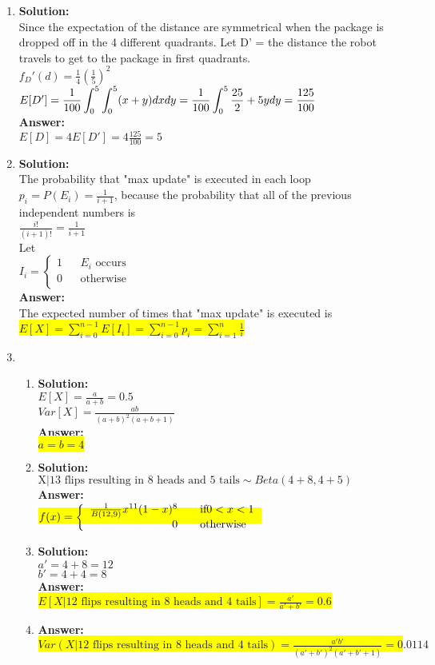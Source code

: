 \documentclass{article}
\newcommand{\myansw}{\textbf{Answer:}\\}
\newcommand{\mysolu}{\textbf{Solution:}\\}
\begin{document}
\begin{enumerate}
\begin{enumerate}
	\end{enumerate}
	\item
	\mysolu
	Since the expectation of the distance are symmetrical when the package is dropped off in the 4 different quadrants. Let D' = the distance the robot travels to get to the package in first quadrants.\\
	${f_D'(d) = \frac{1}{4}(\frac{1}{5})^2}$\\
	${E[D']=\mathlarger{\frac{1}{100}\int_{0}^{5} \int_{0}^{5} (x+y) dxdy=\frac{1}{100}\int_{0}^{5} \frac{25}{2}+5ydy=\frac{125}{100}}}$\\
	\myansw
	${E[D] = 4E[D'] = 4 \frac{125}{100} = 5}$\\
	\item
	\mysolu
	The probability that "max update" is executed in each loop ${p_i =P(E_i)= \frac{1}{i+1}}$, because the probability that all of the previous independent numbers is\\
	${ \frac{i!}{(i+1)!}=\frac{1}{i+1}}$\\
	Let\\
	${I_i = \left\lbrace \begin{array}{rcl}1 & & E_i \text{ occurs}\\
		0 & &  \text{otherwise}\\
		\end{array}\right.}$\\
	\myansw
	The expected number of times that "max update" is executed is\\
	\colorbox{yellow}{${E[X] = \sum\limits_{i = 0}^{n-1}E[I_i] = \sum\limits_{i = 0}^{n-1}p_i = \sum\limits_{i = 1}^{n}\frac{1}{i}}$}
	
	\item
	\begin{enumerate}
		\item
		\mysolu
		${E[X] = \frac{a}{a+b} = 0.5}$\\
		${Var[X] =\frac{ab}{(a+b)^2(a+b+1)}}$\\
		\myansw
		\colorbox{yellow}{${a = b = 4}$}\\
		\item
		\mysolu
		${\text{X}|\text{13 flips resulting in 8 heads and 5 tails} \sim Beta(4+8, 4+5)}$\\
		\myansw
		\colorbox{yellow}{
			${\mathlarger{f(x) = \left\lbrace \begin{array}{rcl} \frac{1}{B(12,9)}x^{11}(1-x)^{8} & & \text{if} 0<x<1\\
				0 & & \text{otherwise}\\
				\end{array}\right.}}$
		}\\
		\item
		\mysolu
		${a' = 4 + 8 = 12}$\\
		${b' = 4 + 4 = 8}$\\
		\myansw
		\colorbox{yellow}{${E[X|\text{12 flips resulting in 8 heads and 4 tails}] = \frac{a'}{a'+b'} = 0.6}$}\\
		\item
		\myansw
		\colorbox{yellow}{${Var(X|\text{12 flips resulting in 8 heads and 4 tails}) = \frac{a'b'}{(a'+b')^2(a'+b'+1)}=0.0114}$}\\
		

\end{enumerate}
\end{enumerate}
\end{document}

